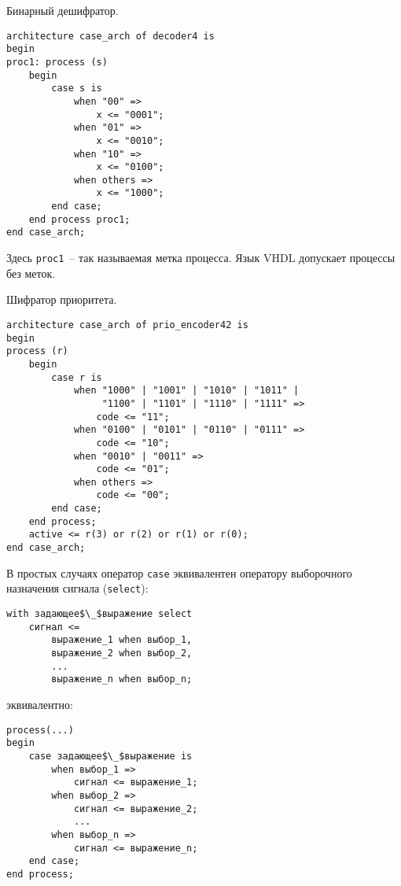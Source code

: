  Бинарный дешифратор.

\begin{Code}
\begin{lstlisting}
architecture case_arch of decoder4 is
begin
proc1: process (s)
    begin
        case s is
            when "00" => 
                x <= "0001";
            when "01" => 
                x <= "0010";
            when "10" => 
                x <= "0100";
            when others => 
                x <= "1000";
        end case;
    end process proc1;
end case_arch;
\end{lstlisting}
\end{Code}

Здесь \lstinline?proc1?~-- так называемая метка процесса. Язык VHDL допускает процессы без меток.

 Шифратор приоритета.

\begin{Code}
\begin{lstlisting}
architecture case_arch of prio_encoder42 is
begin
process (r)
    begin
        case r is
            when "1000" | "1001" | "1010" | "1011" | 
                 "1100" | "1101" | "1110" | "1111" => 
                code <= "11";
            when "0100" | "0101" | "0110" | "0111" => 
                code <= "10";
            when "0010" | "0011" => 
                code <= "01";
            when others => 
                code <= "00";
        end case;
    end process;
    active <= r(3) or r(2) or r(1) or r(0);
end case_arch;
\end{lstlisting}
\end{Code}

В простых случаях оператор \lstinline?case? эквивалентен оператору выборочного назначения сигнала (\lstinline?select?):

\begin{Code}
\begin{lstlisting}[mathescape]
with задающее$\_$выражение select
    сигнал <=
        выражение_1 when выбор_1,
        выражение_2 when выбор_2,
        ...
        выражение_n when выбор_n;
\end{lstlisting}
\end{Code}

эквивалентно:

\begin{Code}
\begin{lstlisting}[mathescape]
process(...)
begin
    case задающее$\_$выражение is
        when выбор_1 =>
            сигнал <= выражение_1;
        when выбор_2 =>
            сигнал <= выражение_2;
            ...
        when выбор_n =>
            сигнал <= выражение_n;
    end case;
end process;
\end{lstlisting}
\end{Code}

